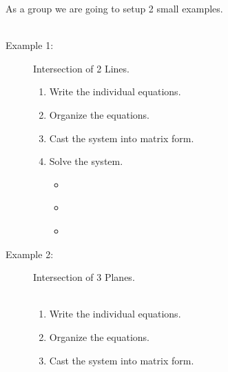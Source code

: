 \documentclass[11pt]{article}
\begin{document}
\begin{itemize}
		As a group we are going to setup 2 small examples. \\\\
		\begin{description}
		\item [Example 1:] Intersection of 2 Lines.  \hspace{5mm} \scalebox{1.25}{ax+by=c} \\
		\begin{enumerate}
		
			\item Write the individual equations. \vspace{100mm}
		
			\item Organize the equations.

\newpage 
		
			\item Cast the system into matrix form. \vspace{140mm}
			
			\item Solve the system. \\
			\begin{itemize}
				\item \hspace{10mm} \\
				\item \hspace{10mm} \\
				\item \hspace{10mm} \\
			\end{itemize}
		
		\end{enumerate}
		
		\newpage 
		\item [Example 2:] Intersection of 3 Planes.  \scalebox{1.25}{ax+by+cz=d} \\\\
		\begin{enumerate}
		
			\item Write the individual equations. \vspace{100mm}
		
			\item Organize the equations.

\newpage 
		
			\item Cast the system into matrix form. \vspace{140mm}
			

\end{enumerate}
\end{description}
\end{itemize}
\end{document}
